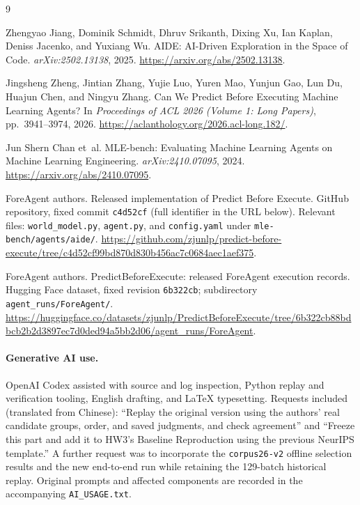 \documentclass{article}
\begin{document}
\begin{thebibliography}{9}

Zhengyao Jiang, Dominik Schmidt, Dhruv Srikanth, Dixing Xu, Ian Kaplan, Deniss Jacenko, and Yuxiang Wu.
\newblock AIDE: AI-Driven Exploration in the Space of Code.
\newblock \emph{arXiv:2502.13138}, 2025.
\newblock \url{https://arxiv.org/abs/2502.13138}.

Jingsheng Zheng, Jintian Zhang, Yujie Luo, Yuren Mao, Yunjun Gao, Lun Du, Huajun Chen, and Ningyu Zhang.
\newblock Can We Predict Before Executing Machine Learning Agents?
\newblock In \emph{Proceedings of ACL 2026 (Volume 1: Long Papers)}, pp.\ 3941--3974, 2026.
\newblock \url{https://aclanthology.org/2026.acl-long.182/}.

Jun Shern Chan et~al.
\newblock MLE-bench: Evaluating Machine Learning Agents on Machine Learning Engineering.
\newblock \emph{arXiv:2410.07095}, 2024.
\newblock \url{https://arxiv.org/abs/2410.07095}.

ForeAgent authors.
\newblock Released implementation of Predict Before Execute.
\newblock GitHub repository, fixed commit \texttt{c4d52cf} (full identifier in the URL below).
\newblock Relevant files: \texttt{world\_model.py}, \texttt{agent.py}, and \texttt{config.yaml} under \texttt{mle-bench/agents/aide/}.
\newblock \url{https://github.com/zjunlp/predict-before-execute/tree/c4d52cf99bd870d830b456ac7c0684aec1aef375}.


ForeAgent authors.
\newblock PredictBeforeExecute: released ForeAgent execution records.
\newblock Hugging Face dataset, fixed revision \texttt{6b322cb}; subdirectory \texttt{agent\_runs/ForeAgent/}.
\newblock \url{https://huggingface.co/datasets/zjunlp/PredictBeforeExecute/tree/6b322cb88bdbcb2b2d3897ec7d0ded94a5bb2d06/agent_runs/ForeAgent}.

\end{thebibliography}

\paragraph{Generative AI use.}
OpenAI Codex assisted with source and log inspection, Python replay and verification tooling, English drafting, and LaTeX typesetting. Requests included (translated from Chinese): ``Replay the original version using the authors' real candidate groups, order, and saved judgments, and check agreement'' and ``Freeze this part and add it to HW3's Baseline Reproduction using the previous NeurIPS template.'' A further request was to incorporate the \texttt{corpus26-v2} offline selection results and the new end-to-end run while retaining the 129-batch historical replay. Original prompts and affected components are recorded in the accompanying \texttt{AI\_USAGE.txt}.
\end{document}
